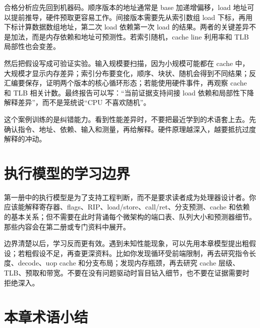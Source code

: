 合格分析应先回到机器码。顺序版本的地址通常是 base 加递增偏移，load 地址可以提前推导，硬件预取更容易工作。间接版本需要先从索引数组 load 下标，再用下标计算数据数组地址，第二次 load 依赖第一次 load 的结果。两者的关键差异不是加法，而是内存依赖和地址可预测性。若索引随机，cache line 利用率和 TLB 局部性也会变差。

然后把假设写成可验证实验。输入规模要扫描，因为小规模可能都在 cache 中，大规模才显示内存差异；索引分布要变化，顺序、块状、随机会得到不同结果；反汇编要保存，证明两个版本的核心循环形态；若能使用硬件事件，再观察 cache 和 TLB 相关计数。最终报告可以写：“当前证据支持间接 load 依赖和局部性下降解释差异”，而不是笼统说“CPU 不喜欢随机”。

这个案例训练的是纠错能力。看到性能差异时，不要把最近学到的术语套上去。先确认指令、地址、依赖、输入和测量，再给解释。硬件原理越深入，越要抵抗过度解释的冲动。

\section{执行模型的学习边界}

第一册中的执行模型是为了支持工程判断，而不是要求读者成为处理器设计者。你应该能解释寄存器、flags、RIP、load/store、call/ret、分支预测、cache 和依赖的基本关系；但不需要在此时背诵每个微架构的端口表、队列大小和预测器细节。那些内容会在第二册或专门资料中展开。

边界清楚以后，学习反而更有效。遇到未知性能现象，可以先用本章模型提出粗假设；若粗假设不足，再查更深资料。比如你发现循环受前端限制，再去研究指令长度、decode、uop cache 和分支布局；发现内存瓶颈，再去研究 cache 层级、TLB、预取和带宽。不要在没有问题驱动时盲目钻入细节，也不要在证据需要时拒绝深入。

\section{本章术语小结}

